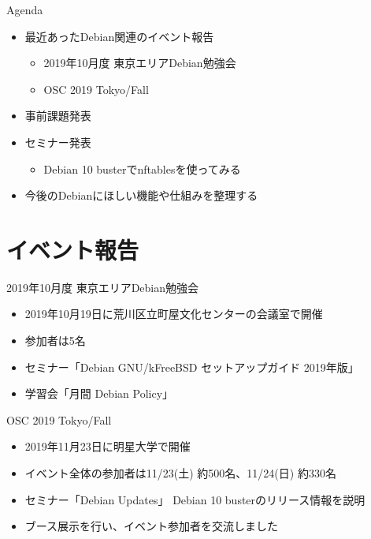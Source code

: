 \begin{frame}{Agenda}
 \begin{minipage}[t]{0.45\hsize}
  \begin{itemize}
  \item 最近あったDebian関連のイベント報告
    \begin{itemize}
    \item 2019年10月度 東京エリアDebian勉強会
    \item OSC 2019 Tokyo/Fall
    \end{itemize}
  \item 事前課題発表
  \end{itemize}
 \end{minipage}
 \begin{minipage}[t]{0.45\hsize}
   \begin{itemize}
   \item セミナー発表
     \begin{itemize}
     \item Debian 10 busterでnftablesを使ってみる
     \end{itemize}
  \item 今後のDebianにほしい機能や仕組みを整理する
  \end{itemize}
 \end{minipage}
\end{frame}

\section{イベント報告}

\begin{frame}{2019年10月度 東京エリアDebian勉強会}
\begin{itemize}
\item 2019年10月19日に荒川区立町屋文化センターの会議室で開催
\item 参加者は5名
\item セミナー「Debian GNU/kFreeBSD セットアップガイド 2019年版」
\item 学習会「月間 Debian Policy」
\end{itemize} 
\end{frame}

\begin{frame}{OSC 2019 Tokyo/Fall}
\begin{itemize}
\item 2019年11月23日に明星大学で開催
\item イベント全体の参加者は11/23(土)  約500名、11/24(日) 約330名
\item セミナー「Debian Updates」 Debian 10 busterのリリース情報を説明
\item ブース展示を行い、イベント参加者を交流しました
\end{itemize} 
\end{frame}


